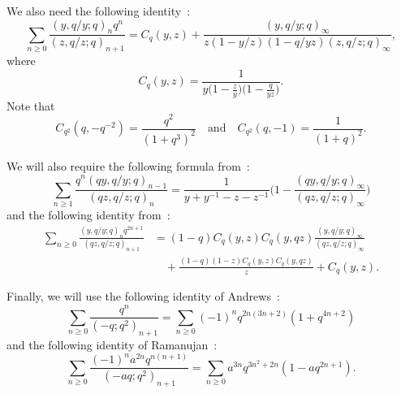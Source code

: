 \documentclass[reqno]{amsart}
\theoremstyle{definition}
\theoremstyle{plain}
\theoremstyle{remark}
\numberwithin{equation}{section}
\newcommand{\fr}{\frac}
\begin{document}
We also need the following identity~\cite{Andrews-Bachraoui, Chan-Mao}:
\begin{equation}\label{Chan-Mao}
\sum_{n\geq 0}\fr{(y,q/y;q)_n q^n}{(z,q/z;q)_{n+1}}
= C_q(y,z)
  +\fr{(y,q/y;q)_\infty}{z(1-y/z)(1-q/yz)(z,q/z;q)_\infty},
\end{equation}
where
\[
C_q(y,z) = \fr{1}{y\big(1-\frac{z}{y}\big) \big(1-\frac{q}{yz}\big)}.
\]
Note that
\begin{equation}\label{basic-C}
C_{q^2}(q,-q^{-2})= \fr{q^2}{(1+q^3)^2}
\quad\text{and}\quad
C_{q^2}(q,-1)=\fr{1}{(1+q)^2}.
\end{equation}

We will also require the following formula from~\cite{Andrews-Bachraoui companions}:
\begin{equation}\label{Gea-Mel cmpn}
\sum_{n\geq 1} \fr{q^n (qy,q/y;q)_{n-1}}{(qz,q/z;q)_{n}}
= \fr{1}{y+y^{-1}-z-z^{-1}}
  \Big( 1 - \fr{(qy,q/y;q)_\infty}{(qz,q/z;q)_\infty}\Big)
\end{equation}
and the following identity from~\cite{Andrews-Bachraoui}:
\begin{align}
\sum_{n\geq 0} \fr{(y,q/y;q)_n q^{2n+1}}{(qz,q/z;q)_{n+1}}
&=(1-q)C_q(y,z)C_q(y,qz)
   \fr{(y,q/y;q)_\infty}{(qz,q/z;q)_\infty} \nonumber \\[4pt]
&\quad + \fr{(1-q)(1-z) C_q(y,z)C_q(y,qz)}{z}
       + C_q(y,z). \label{id appl-1}
\end{align}

Finally, we will use the following identity of Andrews~\cite[Eq.~(5.1)]{Andrews 1979}:
\begin{equation}\label{marvelous}
\sum_{n\geq 0} \fr{q^{n}}{(-q;q^2)_{n+1}}
 = \sum_{n\geq 0} (-1)^n q^{2n(3n+2)}(1+q^{4n+2})
\end{equation}
and the following identity of Ramanujan~\cite[Entry~9.5.1]{Andrews-Berndt I}:
\begin{equation}\label{Entry951}
\sum_{n\geq 0}\fr{(-1)^n a^{2n} q^{n(n+1)}}{(-aq;q^2)_{n+1}}
= \sum_{n\geq 0} a^{3n} q^{3n^2 +2n}(1-aq^{2n+1}).
\end{equation}
%
\end{document}
